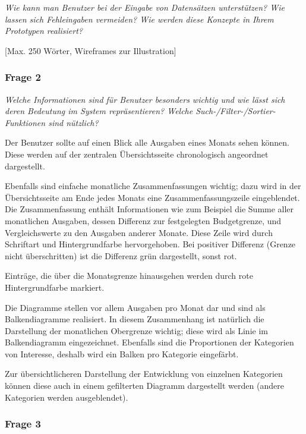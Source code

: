 \emph{Wie kann man Benutzer bei der Eingabe von Datensätzen unterstützen? Wie lassen sich Fehleingaben vermeiden? Wie werden diese Konzepte in Ihrem Prototypen realisiert?}

\vspace{2mm}


[Max. 250 Wörter, Wireframes zur Illustration]



\subsubsection{Frage 2}

\emph{Welche Informationen sind für Benutzer besonders wichtig und wie lässt sich deren Bedeutung im System repräsentieren? Welche Such-/Filter-/Sortier-Funktionen sind nützlich?}

\vspace{2mm}

Der Benutzer sollte auf einen Blick alle Ausgaben eines Monats sehen k\"onnen. Diese
werden auf der zentralen \"Ubersichtsseite chronologisch angeordnet dargestellt.

Ebenfalls sind einfache monatliche Zusammenfassungen wichtig; dazu wird in der
\"Ubersichtsseite am Ende jedes Monats eine Zusammenfassungszeile eingeblendet.
Die Zusammenfassung enth\"alt Informationen wie zum Beispiel die Summe aller monatlichen
Ausgaben, dessen Differenz zur festgelegten Budgetgrenze, und Vergleichswerte zu den Ausgaben
anderer Monate. Diese Zeile wird durch Schriftart und Hintergrundfarbe hervorgehoben.
Bei positiver Differenz (Grenze nicht \"uberschritten) ist die Differenz gr\"un dargestellt,
sonst rot.

Eintr\"age, die \"uber die Monatsgrenze hinausgehen werden durch rote Hintergrundfarbe
markiert.

Die Diagramme stellen vor allem Ausgaben pro Monat dar und sind als Balkendiagramme realisiert.
In diesem Zusammenhang ist nat\"urlich die Darstellung der monatlichen Obergrenze wichtig;
diese wird als Linie im Balkendiagramm eingezeichnet. Ebenfalls sind die Proportionen der Kategorien
von Interesse, deshalb wird ein Balken pro Kategorie eingef\"arbt.

Zur \"ubersichtlicheren Darstellung der Entwicklung von einzelnen Kategorien k\"onnen
diese auch in einem gefilterten Diagramm dargestellt werden (andere Kategorien werden
ausgeblendet).



\subsubsection{Frage 3}

